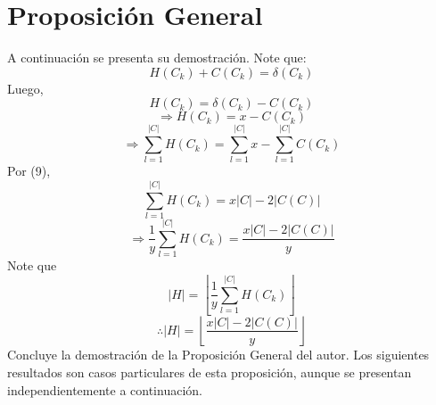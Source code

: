 \documentclass{article}
\begin{document}
\section{Proposición General}
\newtheorem{myteo}{Teorema} 
\begin{center} 
\end{center}
A continuación se presenta su demostración.\newline\newline
Note que:\newline\newline
$$H(C_k)+C(C_k)=\delta(C_k)$$
Luego,\newline
$$H(C_k)=\delta(C_k)-C(C_k)$$
$$\Rightarrow H(C_k)=x-C(C_k)$$
$$\Rightarrow \sum_{l=1}^{|C|}H(C_k)=\sum_{l=1}^{|C|}x-\sum_{l=1}^{|C|}C(C_k)$$
Por (9),\newline
$$\sum_{l=1}^{|C|}H(C_k)=x|C|-2|C(C)|$$
$$\Rightarrow\frac{1}{y}\sum_{l=1}^{|C|}H(C_k)=\frac{x|C|-2|C(C)|}{y}$$
Note que $$|H|=\left\lfloor \frac{1}{y}\sum_{l=1}^{|C|}H(C_k) \right\rfloor$$\newline
$$\therefore|H|=\left\lfloor \frac{x|C|-2|C(C)|}{y} \right\rfloor$$\newline
Concluye la demostración de la Proposición General del autor. Los siguientes resultados son casos particulares de esta proposición, aunque se presentan independientemente a continuación.
\end{document}
